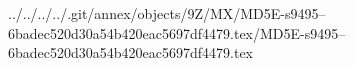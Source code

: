 ../../../../.git/annex/objects/9Z/MX/MD5E-s9495--6badec520d30a54b420eac5697df4479.tex/MD5E-s9495--6badec520d30a54b420eac5697df4479.tex